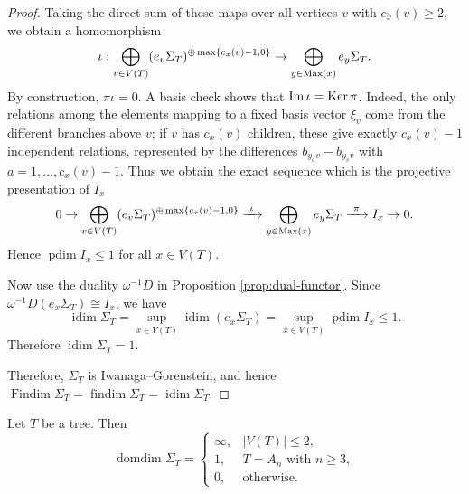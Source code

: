 \documentclass[a4paper,leqno]{amsart}
\begin{document}
\begin{proof}
Taking the direct sum of these maps over all vertices $v$ with $c_x(v)\geq 2$, we obtain a homomorphism
$$\iota:\bigoplus_{v\in V(T)} (e_v\Sigma_T)^{\oplus \max\{c_x(v)-1,0\}}\to
\bigoplus_{y\in \operatorname{Max}(x)}e_y\Sigma_T.$$
By construction, $\pi\iota=0$. A basis check shows that $\operatorname{Im}\iota=\operatorname{Ker}\pi$. Indeed, the only relations among the elements mapping to a fixed basis vector $\xi_v$ come from the different branches above $v$; if $v$ has $c_x(v)$ children, these give exactly $c_x(v)-1$ independent relations, represented by the differences $b_{y_av}-b_{y_sv}$ with $a=1,\dots,c_x(v)-1$.
Thus we obtain the exact sequence which is the projective presentation of $I_x$
$$0\to\bigoplus_{v\in V(T)} (e_v\Sigma_T)^{\oplus \max\{c_x(v)-1,0\}}
\xrightarrow{\ \iota\ }\bigoplus_{y\in \operatorname{Max}(x)} e_y\Sigma_T\xrightarrow{\ \pi\ }I_x\to 0.$$
Hence $\operatorname{pdim}I_x\leq 1$ for all $x\in V(T)$. 

Now use the duality $\omega^{-1}D$ in Proposition \ref{prop:dual-functor}. Since $\omega^{-1}D(e_x\Sigma_T)\cong I_x$, we have
$$ \operatorname{idim}\Sigma_T=\sup_{x\in V(T)}\operatorname{idim}(e_x\Sigma_T)=\sup_{x\in V(T)}\operatorname{pdim}I_x\leq 1.$$
Therefore $\operatorname{idim}\Sigma_T=1$.

Therefore, $\Sigma_T$ is Iwanaga--Gorenstein, and hence
$\operatorname{Findim} \Sigma_T=\operatorname{findim} \Sigma_T=\operatorname{idim}\Sigma_T$.
\end{proof}

\begin{prop}\label{prop:domdim Sigma tree}
Let $T$ be a tree. Then
$$
\operatorname{domdim} \Sigma_T=
\begin{cases}
\infty, & |V(T)|\leq 2,\\
1, & T=A_n\text{ with }n\geq 3,\\
0, & \text{otherwise}.
\end{cases}$$
\end{prop}
\end{document}
